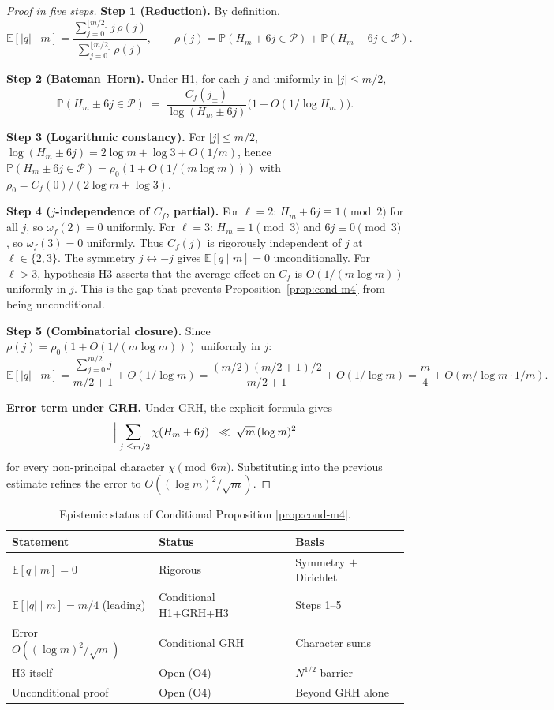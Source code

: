 \documentclass[11pt,a4paper]{article}
\theoremstyle{definition}
\theoremstyle{remark}
\newcommand{\Prob}{\mathbb{P}}
\newcommand{\E}{\mathbb{E}}
\begin{document}
\begin{proof}[Proof in five steps]
\textbf{Step 1 (Reduction).} By definition,
\[
  \E[|q|\mid m]=\frac{\sum_{j=0}^{\lfloor m/2\rfloor}j\,\rho(j)}
       {\sum_{j=0}^{\lfloor m/2\rfloor}\rho(j)},
  \qquad\rho(j)=\Prob(H_{m}+6j\in\mathcal{P})+\Prob(H_{m}-6j\in\mathcal{P}).
\]

\smallskip
\textbf{Step 2 (Bateman--Horn).} Under \textup{H1}, for each $j$
and uniformly in $|j|\le m/2$,
\[
  \Prob(H_{m}\pm 6j\in\mathcal{P})
   \;=\;\frac{C_{f}(j_{\pm})}{\log(H_{m}\pm 6j)}
       \bigl(1+O(1/\log H_{m})\bigr).
\]

\smallskip
\textbf{Step 3 (Logarithmic constancy).} For $|j|\le m/2$,
$\log(H_{m}\pm 6j)=2\log m+\log 3+O(1/m)$, hence
$\Prob(H_{m}\pm 6j\in\mathcal{P})=\rho_{0}(1+O(1/(m\log m)))$ with
$\rho_{0}=C_{f}(0)/(2\log m+\log 3)$.

\smallskip
\textbf{Step 4 ($j$-independence of $C_{f}$, partial).}
For $\ell=2$: $H_{m}+6j\equiv 1\pmod 2$ for all $j$, so
$\omega_{f}(2)=0$ uniformly. For $\ell=3$: $H_{m}\equiv 1\pmod 3$
and $6j\equiv 0\pmod 3$, so $\omega_{f}(3)=0$ uniformly. Thus
$C_{f}(j)$ is rigorously independent of $j$ at $\ell\in\{2,3\}$. The
symmetry $j\leftrightarrow -j$ gives $\E[q\mid m]=0$
unconditionally. For $\ell>3$, hypothesis \textup{H3} asserts that
the average effect on $C_{f}$ is $O(1/(m\log m))$ uniformly in $j$.
This is the gap that prevents Proposition~\ref{prop:cond-m4} from
being unconditional.

\smallskip
\textbf{Step 5 (Combinatorial closure).} Since
$\rho(j)=\rho_{0}(1+O(1/(m\log m)))$ uniformly in $j$:
\[
  \E[|q|\mid m]
   =\frac{\sum_{j=0}^{m/2}j}{m/2+1}+O(1/\log m)
   =\frac{(m/2)(m/2+1)/2}{m/2+1}+O(1/\log m)
   =\frac{m}{4}+O(m/\log m\cdot 1/m).
\]

\smallskip
\textbf{Error term under GRH.} Under \textup{GRH}, the explicit
formula \cite[Thm.~5.15]{IwaniecKowalski2004} gives
\[
  \Bigl|\sum_{|j|\le m/2}\chi(H_{m}+6j)\Bigr|
   \;\ll\;\sqrt{m}\,(\log m)^{2}
\]
for every non-principal character $\chi\pmod{6m}$. Substituting into
the previous estimate refines the error to $O((\log m)^{2}/\sqrt{m})$.
\end{proof}

\begin{table}[ht]\centering
\caption{Epistemic status of Conditional Proposition
\ref{prop:cond-m4}.}
\begin{tabular}{@{}lll@{}}
\toprule
Statement & Status & Basis \\
\midrule
$\E[q\mid m]=0$ & Rigorous & Symmetry $+$ Dirichlet \\
$\E[|q|\mid m]=m/4$ (leading) & Conditional H1+GRH+H3 & Steps 1--5 \\
Error $O((\log m)^{2}/\sqrt{m})$ & Conditional GRH & Character sums \\
H3 itself & Open (O4) & $N^{1/2}$ barrier \\
Unconditional proof & Open (O4) & Beyond GRH alone \\
\bottomrule
\end{tabular}
\end{table}
\end{document}
